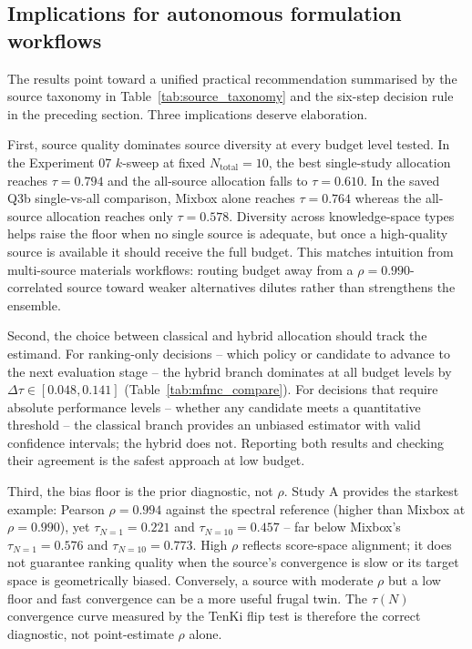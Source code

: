 \documentclass[twoside,twocolumn,9pt]{article}
\begin{document}
\subsection{Implications for autonomous formulation workflows}

The results point toward a unified practical recommendation summarised by the source taxonomy in Table~\ref{tab:source_taxonomy} and the six-step decision rule in the preceding section. Three implications deserve elaboration.

First, source quality dominates source diversity at every budget level tested. In the Experiment 07 $k$-sweep at fixed $N_\mathrm{total} = 10$, the best single-study allocation reaches $\tau = 0.794$ and the all-source allocation falls to $\tau = 0.610$. In the saved Q3b single-vs-all comparison, Mixbox alone reaches $\tau = 0.764$ whereas the all-source allocation reaches only $\tau = 0.578$. Diversity across knowledge-space types helps raise the floor when no single source is adequate, but once a high-quality source is available it should receive the full budget. This matches intuition from multi-source materials workflows: routing budget away from a $\rho = 0.990$-correlated source toward weaker alternatives dilutes rather than strengthens the ensemble.

Second, the choice between classical and hybrid allocation should track the estimand. For ranking-only decisions -- which policy or candidate to advance to the next evaluation stage -- the hybrid branch dominates at all budget levels by $\Delta\tau \in [0.048, 0.141]$ (Table~\ref{tab:mfmc_compare}). For decisions that require absolute performance levels -- whether any candidate meets a quantitative threshold -- the classical branch provides an unbiased estimator with valid confidence intervals; the hybrid does not. Reporting both results and checking their agreement is the safest approach at low budget.

Third, the bias floor is the prior diagnostic, not $\rho$. Study A provides the starkest example: Pearson $\rho = 0.994$ against the spectral reference (higher than Mixbox at $\rho = 0.990$), yet $\tau_{N=1} = 0.221$ and $\tau_{N=10} = 0.457$ -- far below Mixbox's $\tau_{N=1} = 0.576$ and $\tau_{N=10} = 0.773$. High $\rho$ reflects score-space alignment; it does not guarantee ranking quality when the source's convergence is slow or its target space is geometrically biased. Conversely, a source with moderate $\rho$ but a low floor and fast convergence can be a more useful frugal twin. The $\tau(N)$ convergence curve measured by the TenKi flip test is therefore the correct diagnostic, not point-estimate $\rho$ alone.
\end{document}
